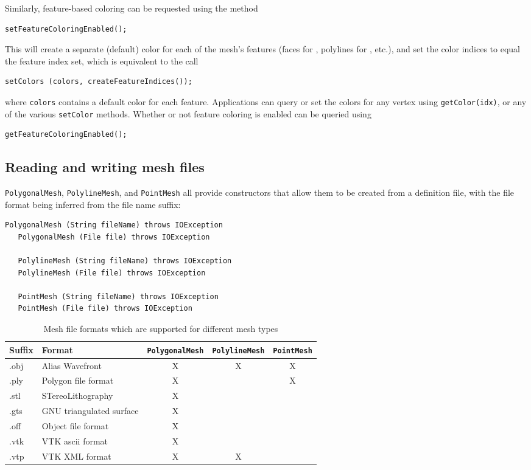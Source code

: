 Similarly, feature-based coloring can be requested using the method
%
\begin{lstlisting}[]
   setFeatureColoringEnabled();
\end{lstlisting}
%
This will create a separate (default) color for each of the mesh's
features (faces for 
, polylines for
, etc.),
and set the color indices to equal the feature 
index set, which is equivalent to the call
%
\begin{lstlisting}[]
   setColors (colors, createFeatureIndices());
\end{lstlisting}
%
where {\tt colors} contains a default color for each feature.
Applications can query or set the colors
for any vertex using {\tt getColor(idx)}, or any of the
various {\tt setColor} methods. Whether or not feature coloring
is enabled can be queried using
%
\begin{lstlisting}[]
   getFeatureColoringEnabled();
\end{lstlisting}
%

\subsection{Reading and writing mesh files}
\label{MeshFileIO:sec}

{\tt PolygonalMesh}, {\tt PolylineMesh}, and {\tt PointMesh} all
provide constructors that allow them to be created from a definition
file, with the file format being inferred from the file name
suffix:
%
\begin{lstlisting}[]
   PolygonalMesh (String fileName) throws IOException
   PolygonalMesh (File file) throws IOException

   PolylineMesh (String fileName) throws IOException
   PolylineMesh (File file) throws IOException

   PointMesh (String fileName) throws IOException
   PointMesh (File file) throws IOException
\end{lstlisting}
%
\begin{table}[h]
\centering
\begin{tabular}{|ll|ccc|}
\hline
Suffix & Format & {\tt PolygonalMesh} & {\tt PolylineMesh} & {\tt PointMesh} \\
\hline
.obj & Alias Wavefront &X&X&X\\
.ply & Polygon file format &X&&X\\
.stl & STereoLithography &X&&\\
.gts & GNU triangulated surface &X&&\\
.off & Object file format &X&&\\
.vtk & VTK ascii format &X&&\\
.vtp & VTK XML format &X&X&\\
\hline
\end{tabular}
\caption{Mesh file formats which are supported for different mesh types}
\label{meshFormatSupport:tbl}
\end{table}


